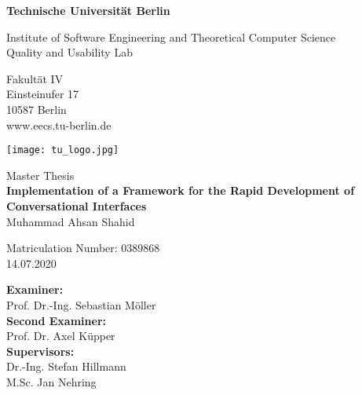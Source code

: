 \thispagestyle{empty}
\begin{center}

\vspace*{1cm}
{\LARGE \textbf{Technische Universität Berlin}}

\vspace{0.5cm}

{\large Institute of Software Engineering and Theoretical Computer Science\\[1mm]}
{\large Quality and Usability Lab\\[5mm]}

Fakultät IV\\
Einsteinufer 17\\
10587 Berlin\\
www.eecs.tu-berlin.de\\

\vspace*{0.8cm}

\texttt{[image: tu\_logo.jpg]}

\vspace*{0.6cm}

{\LARGE Master Thesis}\\

\vspace{0.6cm}
{\LARGE \textbf{Implementation of a Framework for the Rapid Development of Conversational Interfaces}}\\
\vspace*{1.0cm}
{\LARGE Muhammad Ahsan Shahid}
\vspace*{0.5cm}

Matriculation Number: 0389868\\
14.07.2020\\  %
\vspace*{0.6cm}

\textbf{Examiner:}\\
Prof. Dr.-Ing. Sebastian Möller\\
\vspace*{0.4cm}
\textbf{Second Examiner:}\\
Prof. Dr. Axel Küpper\\
\vspace*{0.4cm}
\textbf{Supervisors:}\\
Dr.-Ing. Stefan Hillmann\\
M.Sc. Jan Nehring
\vspace*{0.4cm}




\end{center}
